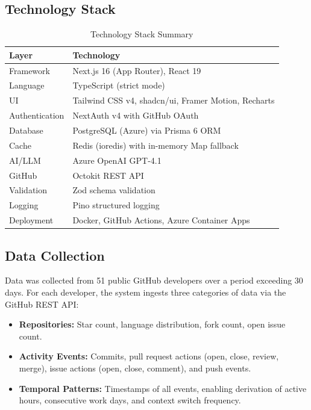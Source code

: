 \documentclass[12pt]{article}
\begin{document}
\subsection{Technology Stack}

\begin{table}[H]
\centering
\caption{Technology Stack Summary}
\label{tab:techstack}
\begin{tabular}{@{}ll@{}}
\toprule
\textbf{Layer} & \textbf{Technology} \\
\midrule
Framework      & Next.js 16 (App Router), React 19 \\
Language       & TypeScript (strict mode) \\
UI             & Tailwind CSS v4, shadcn/ui, Framer Motion, Recharts \\
Authentication & NextAuth v4 with GitHub OAuth \\
Database       & PostgreSQL (Azure) via Prisma 6 ORM \\
Cache          & Redis (ioredis) with in-memory Map fallback \\
AI/LLM         & Azure OpenAI GPT-4.1 \\
GitHub         & Octokit REST API \\
Validation     & Zod schema validation \\
Logging        & Pino structured logging \\
Deployment     & Docker, GitHub Actions, Azure Container Apps \\
\bottomrule
\end{tabular}
\end{table}

\subsection{Data Collection}

Data was collected from 51 public GitHub developers over a period exceeding 30 days. For each developer, the system ingests three categories of data via the GitHub REST API:

\begin{itemize}[noitemsep]
    \item \textbf{Repositories:} Star count, language distribution, fork count, open issue count.
    \item \textbf{Activity Events:} Commits, pull request actions (open, close, review, merge), issue actions (open, close, comment), and push events.
    \item \textbf{Temporal Patterns:} Timestamps of all events, enabling derivation of active hours, consecutive work days, and context switch frequency.
\end{itemize}
\end{document}
